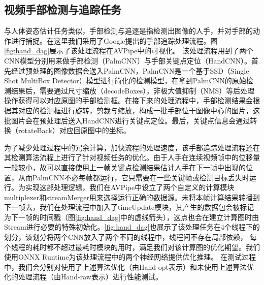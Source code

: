 \subsection{视频手部检测与追踪任务}
与人体姿态估计任务类似，手部检测与追逐是指检测出图像的人手，并对手部的动作进行捕捉。在这里我们采用了Google提出的手部追踪处理流程\cite{mediapipe_hand}。图\ref{fig:hand_dag}展示了该处理流程在AVPipe中的可视化。
该处理流程用到了两个CNN模型分别用来做手部检测（PalmCNN）与手部关键点定位（HandCNN）。首先经过预处理的图像数据会送入PalmCNN，PalmCNN是一个基于SSD（Single Shot MultiBox Detector）\cite{liu2016ssd}模型进行简化的检测模型，在拿到PalmCNN的原始检测结果后，需要通过尺寸缩放（decodeBoxes），非极大值抑制（NMS）等后处理操作获得可以对应原图的手部检测框。在接下来的处理流程中，手部检测结果会根据其对应的检测框进行旋转，剪裁与缩放，构成一批手部位于图像中心的图片，这批图片会在预处理后送入HandCNN进行关键点定位。最后，关键点信息会通过转换（rotateBack）对应回原图中的坐标。\par
为了减少处理过程中的冗余计算，加快流程的处理速度，该手部追踪处理流程还在其检测算法流程上进行了针对视频任务的优化。由于人手在连续视频帧中的位移量一般较小，故可以直接使用上一帧关键点检测结果估计人手在下一帧中出现的位置，从而PalmCNN不必每帧都运行，它只需要在一些关键帧或检测目标丢失时运行。为实现这部处理逻辑，我们在AVPipe中设立了两个自定义的计算模块multiplexer和streamMerger用来选择运行正确的数据源。未将本帧计算结果转播到下一帧去，我们在处理流程中加入了timeUpdate模块，其产生的数据包会被标记为下一帧的时间戳（图\ref{fig:hand_dag}中的虚线箭头），这点也会在建立计算图时由Stream进行必要的特殊初始化。\ref{fig:hand_dag}也展示了该处理任务在4个线程下的划分，该划分将两个CNN放入了两个不同的线程中，线程间不存在局部依赖，
每个线程的耗时都不超过最耗时模块的用时，满足我们对该计算图的优化期望。我们使用ONNX Runtime为该处理流程中的两个神经网络提供优化推理。
在测试过程中，我们会分别对使用了上述算法优化（由Hand-opt表示）和未使用上述算法优化的处理流程（由Hand-raw表示）进行性能测试。

